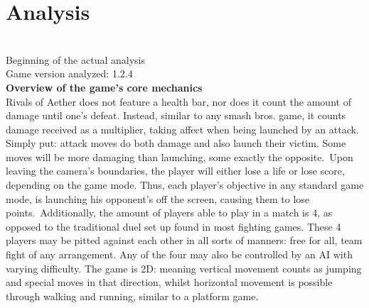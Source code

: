 \documentclass{article}
\begin{document}
\chapter{\textbf{Analysis}}\\
Beginning of the actual analysis\\
Game version analyzed: 1.2.4\\%
\textbf{Overview of the game's core mechanics}\\
Rivals of Aether does not feature a health bar, nor does it count the amount of damage until one's defeat. Instead, similar to any smash bros. game, it counts damage received as a multiplier, taking affect when being launched by an attack. Simply put: attack moves do both damage and also launch their victim. Some moves will be more damaging than launching, some exactly the opposite.\
Upon leaving the camera's boundaries, the player will either lose a life or lose score, depending on the game mode. Thus, each player's objective in any standard game mode, is launching his opponent's off the screen, causing them to lose points.\
 Additionally, the amount of players able to play in a match is 4, as opposed to the traditional duel set up found in most fighting games. These 4 players may be pitted against each other in all sorts of manners: free for all, team fight of any arrangement. Any of the four may also be controlled by an AI with varying difficulty. The game is 2D: meaning vertical movement counts as jumping and special moves in that direction, whilst horizontal movement is possible through walking and running, similar to a platform game.\\ %
\end{document}
